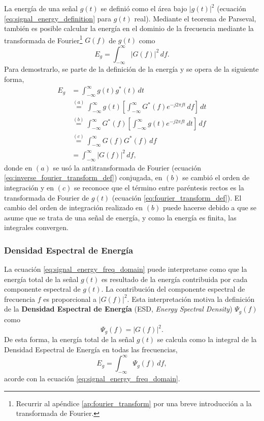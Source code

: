 \documentclass[a4paper]{article}
\begin{document}
La energía de una señal \(g(t)\) se definió como el área bajo \(|g(t)|^2\) (ecuación \ref{eq:signal_energy_definition} para \(g(t)\) real). Mediante el teorema de Parseval, también es posible calcular la energía en el dominio de la frecuencia mediante la transformada de Fourier\footnote{Recurrir al apéndice \ref{ap:fourier_transform} por una breve introducción a la transformada de Fourier.} \(G(f)\) de \(g(t)\) como 
\begin{equation}\label{eq:signal_energy_freq_domain}
 E_g = \int_{-\infty}^{\infty}|G(f)|^2\,df.
\end{equation}
Para demostrarlo, se parte de la definición de la energía y se opera de la siguiente forma,
\begin{align*}
 E_g &= \int_{-\infty}^{\infty}g(t)g^*(t)\,dt\\
  &\overset{(a)}{=}\int_{-\infty}^{\infty}g(t)\left[\int_{-\infty}^{\infty}G^*(f)e^{-j2\pi ft}\,df\right]\,dt\\
  &\overset{(b)}{=}\int_{-\infty}^{\infty}G^*(f)\left[\int_{-\infty}^{\infty}g(t)e^{-j2\pi ft}\,dt\right]\,df\\
  &\overset{(c)}{=}\int_{-\infty}^{\infty}G(f)G^*(f)\,df\\
  &=\int_{-\infty}^{\infty}|G(f)|^2\,df,
\end{align*}
donde en \((a)\) se usó la antitransformada de Fourier (ecuación \ref{eq:inverse_fourier_transform_def}) conjugada, en \((b)\) se cambió el orden de integración y en \((c)\) se reconoce que el término entre paréntesis rectos es la transformada de Fourier de \(g(t)\) (ecuación \ref{eq:fourier_transform_def}). El cambio del orden de integración realizado en \((b)\) puede hacerse debido a que se asume que se trata de una señal de energía, y como la energía es finita, las integrales convergen.

\subsubsection{Densidad Espectral de Energía}

La ecuación \ref{eq:signal_energy_freq_domain} puede interpretarse como que la energía total de la señal \(g(t)\) es resultado de la energía contribuida por cada componente espectral de \(g(t)\). La contribución del componente espectral de frecuencia \(f\) es proporcional a \(|G(f)|^2\). Esta interpretación motiva la definición de la \textbf{Densidad Espectral de Energía} (ESD, \emph{Energy Spectral Density}) \(\Psi_g(f)\) como
\[
 \Psi_g(f) = |G(f)|^2.
\]
De esta forma, la energía total de la señal \(g(t)\) se calcula como la integral de la Densidad Espectral de Energía en todas las frecuencias,
\[
 E_g = \int_{-\infty}^{\infty}\Psi_g(f)\,df,
\]
acorde con la ecuación \ref{eq:signal_energy_freq_domain}.
\end{document}
